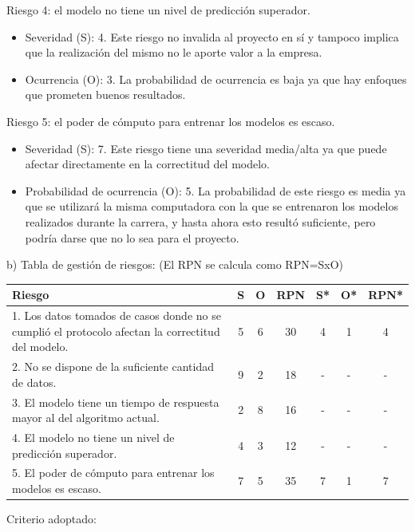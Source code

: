\documentclass[
11pt, %
]{charter}
\begin{document}
Riesgo 4: el modelo no tiene un nivel de predicción superador.
\begin{itemize}
	\item Severidad (S): 4.
	Este riesgo no invalida al proyecto en sí y tampoco implica que la realización del mismo no le aporte valor a la empresa.
	\item Ocurrencia (O): 3.
	La probabilidad de ocurrencia es baja ya que hay enfoques que prometen buenos resultados.
\end{itemize}

Riesgo 5: el poder de cómputo para entrenar los modelos es escaso.
\begin{itemize}
	\item Severidad (S): 7.
	Este riesgo tiene una severidad media/alta ya que puede afectar directamente en la correctitud del modelo.
	\item Probabilidad de ocurrencia (O): 5.
		La probabilidad de este riesgo es media ya que se utilizará la misma computadora con la que se entrenaron los modelos realizados durante la carrera, y hasta ahora esto resultó suficiente, pero podría darse que no lo sea para el proyecto.
\end{itemize}

b) Tabla de gestión de riesgos:      (El RPN se calcula como RPN=SxO)

\begin{table}[htpb]
\centering
\begin{tabularx}{\linewidth}{@{}|X|c|c|c|c|c|c|@{}}
\hline
\rowcolor[HTML]{C0C0C0} 
Riesgo & S & O & RPN & S* & O* & RPN* \\ \hline
1. Los datos tomados de casos donde no se cumplió el protocolo afectan la correctitud del modelo. & 5  & 6  &   30  &  4  &  1  &   4   \\ \hline
2. No se dispone de la suficiente cantidad de datos. & 9  & 2  &  18   &  -  &  -  &  -    \\ \hline
3. El modelo tiene un tiempo de respuesta mayor al del algoritmo actual.& 2  & 8  &  16   &  -  &  -  &  -    \\ \hline
4. El modelo no tiene un nivel de predicción superador.&  4 & 3  &  12   &  -  &  -  &  -    \\ \hline
5. El poder de cómputo para entrenar los modelos es escaso.  & 7  & 5  &  35   &  7  &  1  &   7   \\ \hline
\end{tabularx}%
\end{table}

Criterio adoptado: 
\end{document}
